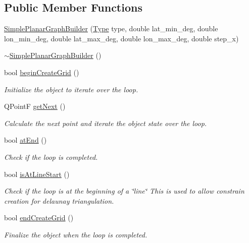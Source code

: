 \subsection*{Public Member Functions}
\begin{DoxyCompactItemize}
\item 
\mbox{\hyperlink{classdisplace_1_1graphbuilders_1_1_simple_planar_graph_builder_a9dd05855ddd31d2c177a0402447e0be3}{Simple\+Planar\+Graph\+Builder}} (\mbox{\hyperlink{classdisplace_1_1graphbuilders_1_1_simple_planar_graph_builder_aedc525514a7c8f011cb4550c8e4addb7}{Type}} type, double lat\+\_\+min\+\_\+deg, double lon\+\_\+min\+\_\+deg, double lat\+\_\+max\+\_\+deg, double lon\+\_\+max\+\_\+deg, double step\+\_\+x)
\item 
\mbox{\hyperlink{classdisplace_1_1graphbuilders_1_1_simple_planar_graph_builder_a197955d0d3e11ca743aef46c2d71543e}{$\sim$\+Simple\+Planar\+Graph\+Builder}} ()
\item 
bool \mbox{\hyperlink{classdisplace_1_1graphbuilders_1_1_simple_planar_graph_builder_acc34e4093c7e96d705b7269bebf20233}{begin\+Create\+Grid}} ()
\begin{DoxyCompactList}\small\item\em Initialize the object to iterate over the loop. \end{DoxyCompactList}\item 
Q\+PointF \mbox{\hyperlink{classdisplace_1_1graphbuilders_1_1_simple_planar_graph_builder_a58f7a91f6889c37b462abaaf0844c49b}{get\+Next}} ()
\begin{DoxyCompactList}\small\item\em Calculate the next point and iterate the object state over the loop. \end{DoxyCompactList}\item 
bool \mbox{\hyperlink{classdisplace_1_1graphbuilders_1_1_simple_planar_graph_builder_abaaebf466b639c6a98777596f3fdc31f}{at\+End}} ()
\begin{DoxyCompactList}\small\item\em Check if the loop is completed. \end{DoxyCompactList}\item 
bool \mbox{\hyperlink{classdisplace_1_1graphbuilders_1_1_simple_planar_graph_builder_ad5a6e8911d9599a5331facc31c5caa11}{is\+At\+Line\+Start}} ()
\begin{DoxyCompactList}\small\item\em Check if the loop is at the beginning of a \char`\"{}line\char`\"{} This is used to allow constrain creation for delaunay triangulation. \end{DoxyCompactList}\item 
bool \mbox{\hyperlink{classdisplace_1_1graphbuilders_1_1_simple_planar_graph_builder_a829ff92a1bd9dba3170a49ed42b193cc}{end\+Create\+Grid}} ()
\begin{DoxyCompactList}\small\item\em Finalize the object when the loop is completed. \end{DoxyCompactList}\end{DoxyCompactItemize}
